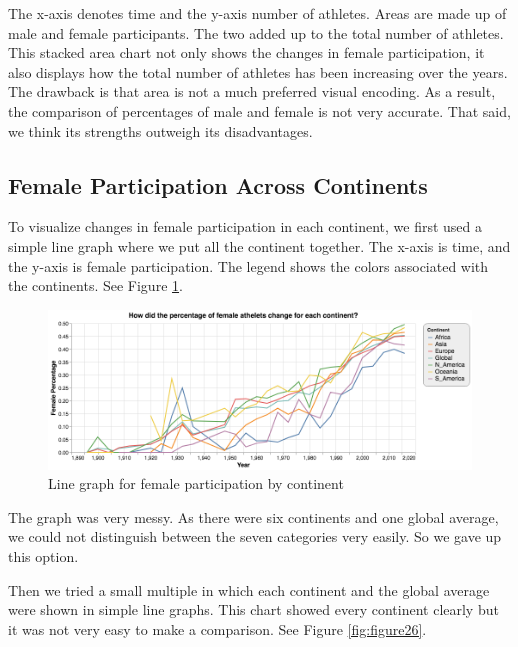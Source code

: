 \documentclass[
]{article}
\begin{document}
The x-axis denotes time and the y-axis number of athletes. Areas are made up of male and female participants. The two added up to the total number of athletes. This stacked area chart not only shows the changes in female participation, it also displays how the total number of athletes has been increasing over the years. The drawback is that area is not a much preferred visual encoding. As a result, the comparison of percentages of male and female is not very accurate. That said, we think its strengths outweigh its disadvantages.

\hypertarget{plots-female-continents}{%
\subsection{Female Participation Across Continents}\label{plots-female-continents}}

To visualize changes in female participation in each continent, we first used a simple line graph where we put all the continent together. The x-axis is time, and the y-axis is female participation. The legend shows the colors associated with the continents. See Figure \ref{fig:figure25}.

\begin{figure}

{\centering \includegraphics[width=1\linewidth]{static/pics/g-2-1_new} 

}

\caption{Line graph for female participation by continent}\label{fig:figure25}
\end{figure}

The graph was very messy. As there were six continents and one global average, we could not distinguish between the seven categories very easily. So we gave up this option.

Then we tried a small multiple in which each continent and the global average were shown in simple line graphs. This chart showed every continent clearly but it was not very easy to make a comparison. See Figure \ref{fig:figure26}.
\end{document}
